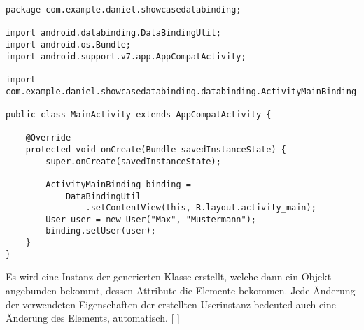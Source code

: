 \documentclass[FIPLY_base.tex]{subfiles}
\begin{document}
\begin{lstlisting}[caption={Die Aktivitätenklasse nach der Integration einer Datenanbindung.},label=DescriptiveLabel]
package com.example.daniel.showcasedatabinding;

import android.databinding.DataBindingUtil;
import android.os.Bundle;
import android.support.v7.app.AppCompatActivity;

import com.example.daniel.showcasedatabinding.databinding.ActivityMainBinding;

public class MainActivity extends AppCompatActivity {

	@Override
	protected void onCreate(Bundle savedInstanceState) {
		super.onCreate(savedInstanceState);

		ActivityMainBinding binding =
			DataBindingUtil
				.setContentView(this, R.layout.activity_main);
		User user = new User("Max", "Mustermann");
		binding.setUser(user);
	}
}
\end{lstlisting}

Es wird eine Instanz der generierten Klasse erstellt, welche dann ein Objekt angebunden bekommt, dessen Attribute die Elemente bekommen. Jede Änderung der verwendeten Eigenschaften der erstellten Userinstanz bedeuted auch eine Änderung des Elements, automatisch. 
[ \cite{datbshowcase}]
\end{document}
